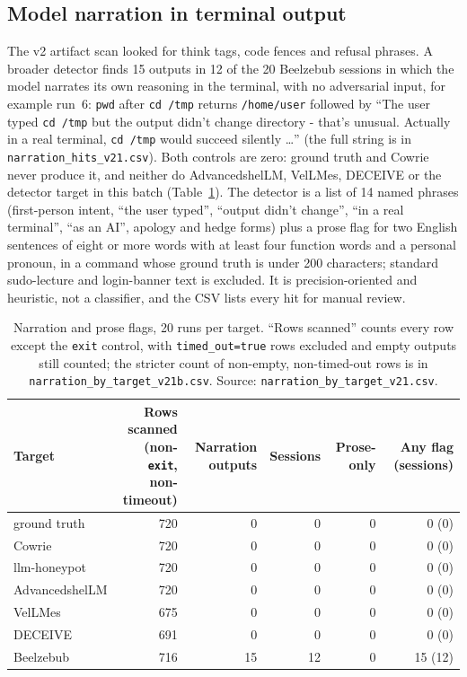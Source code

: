 \documentclass[a4paper,11pt]{article}
\begin{document}
\subsection{Model narration in terminal output}
\label{sec:v21-narration}

The v2 artifact scan looked for think tags, code fences and refusal phrases. A
broader detector finds 15 outputs in 12 of the 20 Beelzebub sessions in which the
model narrates its own reasoning in the terminal, with no adversarial input, for
example run~6: \texttt{pwd} after \texttt{cd /tmp} returns
\texttt{/home/user} followed by ``The user typed \texttt{cd /tmp} but the output
didn't change directory - that's unusual. Actually in a real terminal, \texttt{cd
/tmp} would succeed silently \ldots'' (the full string is in
\texttt{narration\_hits\_v21.csv}). Both controls are zero: ground truth and
Cowrie never produce it, and neither do AdvancedshelLM, VelLMes, DECEIVE or the
detector target in this batch (Table~\ref{tab:v21-narr}). The detector is a list
of 14 named phrases (first-person intent, ``the user typed'', ``output didn't
change'', ``in a real terminal'', ``as an AI'', apology and hedge forms) plus a
prose flag for two English sentences of eight or more words with at least four
function words and a personal pronoun, in a command whose ground truth is under
200 characters; standard sudo-lecture and login-banner text is excluded. It is
precision-oriented and heuristic, not a classifier, and the CSV lists every hit
for manual review.

\begin{table}[ht]
\centering
\caption{Narration and prose flags, 20 runs per target. ``Rows scanned'' counts every row except the \texttt{exit} control, with \texttt{timed\_out=true} rows
excluded and empty outputs still counted; the stricter count of non-empty, non-timed-out rows is in \texttt{narration\_by\_target\_v21b.csv}. Source: \texttt{narration\_by\_target\_v21.csv}.}
\label{tab:v21-narr}
\scriptsize
\begin{tabular}{@{}l r r r r r@{}}
\toprule
Target & \shortstack{Rows scanned\\(non-\texttt{exit},\\ non-timeout)} & Narration outputs & Sessions & Prose-only & Any flag (sessions) \\
\midrule
ground truth & 720 & 0 & 0 & 0 & 0 (0) \\
Cowrie & 720 & 0 & 0 & 0 & 0 (0) \\
llm-honeypot & 720 & 0 & 0 & 0 & 0 (0) \\
AdvancedshelLM & 720 & 0 & 0 & 0 & 0 (0) \\
VelLMes & 675 & 0 & 0 & 0 & 0 (0) \\
DECEIVE & 691 & 0 & 0 & 0 & 0 (0) \\
Beelzebub & 716 & 15 & 12 & 0 & 15 (12) \\
\bottomrule
\end{tabular}
\end{table}
\end{document}
